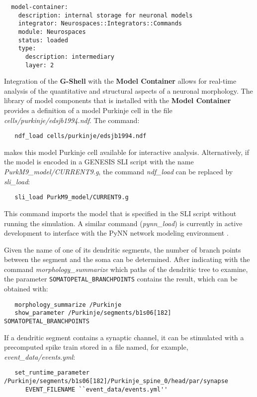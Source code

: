\documentclass[10pt]{article}
\begin{document}
\begin{verbatim}
  model-container:
    description: internal storage for neuronal models
    integrator: Neurospaces::Integrators::Commands
    module: Neurospaces
    status: loaded
    type:
      description: intermediary
      layer: 2
\end{verbatim}

Integration of the {\bf G-Shell} with the {\bf Model Container}
allows for real-time analysis of the quantitative and structural
aspects of a neuronal morphology.  The library of model components
that is installed with the {\bf Model Container} provides a
definition of a model Purkinje cell in the file {\it
  cells/purkinje/edsjb1994.ndf}.  The command:
\begin{verbatim}
   ndf_load cells/purkinje/edsjb1994.ndf
\end{verbatim}
makes this model Purkinje cell available for interactive analysis.
Alternatively, if the model is encoded in a GENESIS SLI script with the
name {\it PurkM9\_model/CURRENT9.g}, the command {\it ndf\_load} can be
replaced by {\it sli\_load}:

\begin{verbatim}
   sli_load PurkM9_model/CURRENT9.g
\end{verbatim}

This command imports the model that is specified in the SLI script
without running the simulation.  A similar command ({\it pynn\_load})
is currently in active development to interface with the PyNN network modeling
environment \cite{davison08:_pynn}.

Given the name of one of its dendritic segments, the number of branch
points between the segment and the soma can be determined. After
indicating with the command {\it morphology\_summarize} which paths of the dendritic tree to examine, the
parameter {\tt SOMATOPETAL\_BRANCHPOINTS} contains the result, which
can be obtained with:

\begin{verbatim}
   morphology_summarize /Purkinje
   show_parameter /Purkinje/segments/b1s06[182] SOMATOPETAL_BRANCHPOINTS
\end{verbatim}

If a dendritic segment contains a synaptic channel, it can be
stimulated with a precomputed spike train stored in a file named, for
example, {\it event\_data/events.yml}:

\begin{verbatim}
   set_runtime_parameter /Purkinje/segments/b1s06[182]/Purkinje_spine_0/head/par/synapse
      EVENT_FILENAME ``event_data/events.yml''
\end{verbatim}
\end{document}
